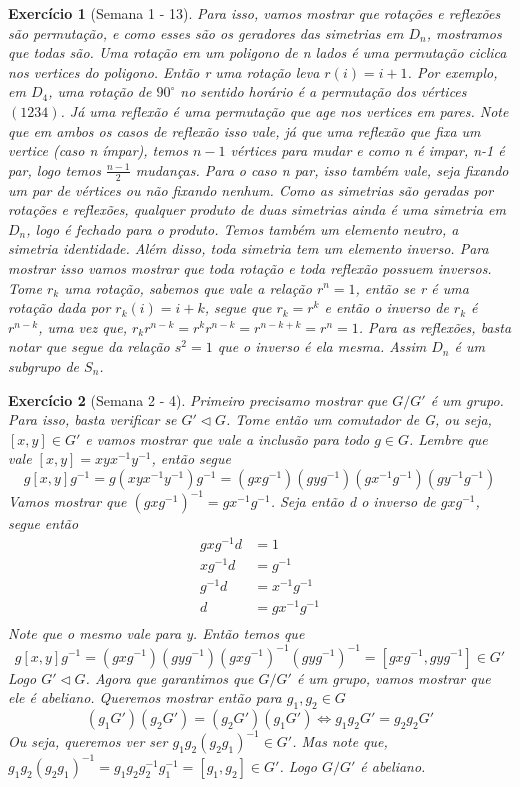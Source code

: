 \documentclass{article}
\newtheorem*{ex}{Exercício}
\begin{document}
\begin{ex}[Semana 1 - 13]
    Para isso, vamos mostrar que rotações e reflexões são permutação, e como esses são os geradores das simetrias 
    em $D_n$, mostramos que todas são.
    Uma rotação em um poligono de n lados é uma permutação ciclica nos vertices do poligono. 
    Então r uma rotação leva $r(i)=i+1$. Por exemplo, em $D_4$, uma rotação 
    de $90^{\circ}$ no sentido horário é a permutação dos vértices $(1234)$.
    Já uma reflexão é uma permutação que age nos vertices em pares. Note 
    que em ambos os casos de reflexão isso vale, já que uma reflexão que fixa
    um vertice (caso n ímpar), temos $n-1$ vértices para mudar e como n é impar, n-1 é par, logo temos $\frac{n-1}{2}$ mudanças.
    Para o caso n par, isso também vale, seja fixando um par de vértices ou não fixando nenhum.
    Como as simetrias são geradas por rotações e reflexões, qualquer produto de duas simetrias ainda é uma simetria em $D_n$, logo é fechado para o produto.
    Temos também um elemento neutro, a simetria identidade.
    Além disso, toda simetria tem um elemento inverso. Para mostrar isso vamos mostrar que toda rotação e toda reflexão possuem inversos.
    Tome $r_k$ uma rotação, sabemos que vale a relação $r^n=1$, então se r é uma rotação dada por
    $r_k(i)=i+k$, segue que $r_k = r^k$ e então o inverso de $r_k$ é $r^{n-k}$, 
    uma vez que, $r_kr^{n-k}=r^kr^{n-k}=r^{n-k+k}=r^n=1$. Para as reflexões, basta notar que
    segue da relação $s^2=1$ que o inverso é ela mesma.
    Assim $D_n$ é um subgrupo de $S_n$.
\end{ex}

\begin{ex}[Semana 2 - 4]
    Primeiro precisamo mostrar que $G/G'$ é um grupo. 
    Para isso, basta verificar se $G' \vartriangleleft G$.
    Tome então um comutador de G, ou seja, $[x, y] \in G'$ e vamos mostrar que vale a inclusão para todo $g \in G$.
    Lembre que vale $[x, y]= xyx^{-1}y^{-1}$, então segue
    \[g[x,y]g^{-1}=g(xyx^{-1}y^{-1})g^{-1}=(gxg^{-1})(gyg^{-1})(gx^{-1}g^{-1})(gy^{-1}g^{-1})\]
    Vamos mostrar que $(gxg^{-1})^{-1}=gx^{-1}g^{-1}$. Seja então d o inverso de $gxg^{-1}$, segue então
    \begin{align*}
        gxg^{-1}d &= 1 \\
        xg^{-1}d &= g^{-1} \\
        g^{-1}d &= x^{-1}g^{-1} \\
        d &= gx^{-1}g^{-1} \\
    \end{align*}
    Note que o mesmo vale para y.
    Então temos que 
    \[g[x,y]g^{-1} = (gxg^{-1})(gyg^{-1})(gxg^{-1})^{-1}(gyg^{-1})^{-1}=[gxg^{-1}, gyg^{-1}] \in G'\]
    Logo $G' \vartriangleleft G$.
    Agora que garantimos que $G/G'$ é um grupo, vamos mostrar que ele é abeliano. 
    Queremos mostrar então para $g_1, g_2 \in G$
    \[(g_1G')(g_2G') = (g_2G')(g_1G') \Leftrightarrow g_1g_2G'=g_2g_2G'\]
    Ou seja, queremos ver ser $g_1g_2(g_2g_1)^{-1} \in G'$. 
    Mas note que, $g_1g_2(g_2g_1)^{-1} = g_1g_2g_2^{-1}g_1^{-1} = [g_1, g_2] \in G'$.
    Logo $G/G'$ é abeliano.
\end{ex}
\end{document}
